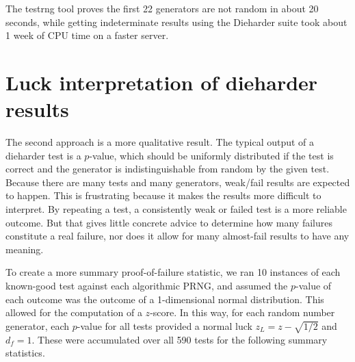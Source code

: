 The testrng tool proves the first 22 generators are not random in about 20 seconds, while getting indeterminate results using the Dieharder suite took about 1 week of CPU time on a faster server.

\section{Luck interpretation of dieharder results}
The second approach is a more qualitative result.  The typical output of a dieharder test is a $p$-value, which should be uniformly distributed if the test is correct and the generator is indistinguishable from random by the given test.  Because there are many tests and many generators, weak/fail results are expected to happen.  This is frustrating because it makes the results more difficult to interpret.  By repeating a test, a consistently weak or failed test is a more reliable outcome.  But that gives little concrete advice to determine how many failures constitute a real failure, nor does it allow for many almost-fail results to have any meaning.

To create a more summary proof-of-failure statistic, we ran 10 instances of each known-good test against each algorithmic PRNG, and assumed the $p$-value of each outcome was the outcome of a 1-dimensional normal distribution.  This  allowed for the computation of a $z$-score.  In this way, for each random number generator, each $p$-value for all tests provided a normal luck $z_L=z-\sqrt{1/2}$ and $d_f=1$. These were accumulated over all 590 tests for the following summary statistics.

